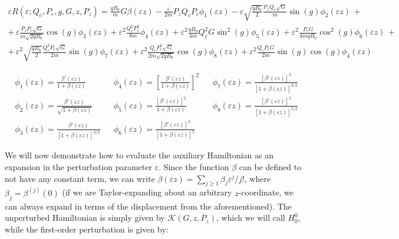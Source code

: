 \fi

\begin{gather*}
    \varepsilon R(\varepsilon;Q_c,P_c, g, G, z, P_z)=\frac{qB_0}{m}G\beta(\varepsilon z)-\frac{\varepsilon}{2m}P_zQ_cP_c \phi_1(\varepsilon z)-\varepsilon\sqrt{\frac{qB_0}{2}}\frac{P_zQ_c\sqrt{G}}{m}\sin{(g)} \phi_2(\varepsilon z)\,+\\
    +\,\varepsilon\frac{P_zP_c\sqrt{G}}{m\sqrt{2qB_0}}\cos{(g)} \phi_3(\varepsilon z)+\varepsilon^2\frac{Q_c^2P_c^2}{8m}\phi_4(\varepsilon z)+\varepsilon^2\frac{qB_0}{4m}Q_c^2G\sin^2{(g)}\phi_5(\varepsilon z)+\varepsilon^2\frac{P_cG}{4mqB_0}\cos^2{(g)}\phi_6(\varepsilon z)\,+\\
    +\,\varepsilon^2 \sqrt{\frac{qB_0}{2}}\frac{Q_c^2P_c\sqrt{G}}{2m}\sin{(g)}\phi_7(\varepsilon z)+\varepsilon^2\frac{Q_cP_c^2\sqrt{G}}{2m\sqrt{2qB_0}}\cos{(g)}\phi_8(\varepsilon z)+\varepsilon^2 \frac{Q_cP_c G}{2m}\sin{(g)}\cos{(g)}\phi_4(\varepsilon z)
\end{gather*}

\begin{align*}
    &\phi_1(\varepsilon z)=\frac{\beta'(\varepsilon z)}{1+\beta(\varepsilon z)} & &\phi_4(\varepsilon z)=\left[\frac{\beta'(\varepsilon z)}{1+\beta(\varepsilon z)}\right]^2 & &\phi_7(\varepsilon z)=\frac{\left[\beta'(\varepsilon z)\right]^2}{\left[1+\beta(\varepsilon z)\right]^{3/2}}\\
    &\phi_2(\varepsilon z)=\frac{\beta'(\varepsilon z)}{\sqrt{1+\beta(\varepsilon z)}}& &\phi_5(\varepsilon z)=\frac{\left[\beta'(\varepsilon z)\right]^2}{1+\beta(\varepsilon z)}& &\phi_8(\varepsilon z)=\frac{\left[\beta'(\varepsilon z)\right]^2}{\left[1+\beta(\varepsilon z)\right]^{5/2}}\\
    &\phi_3(\varepsilon z)=\frac{\beta'(\varepsilon z)}{\left[1+\beta(\varepsilon z)\right]^{3/2}} & &\phi_6(\varepsilon z)=\frac{\left[\beta'(\varepsilon z)\right]^2}{\left[1+\beta(\varepsilon z)\right]^3}
\end{align*}

We will now demonstrate how to evaluate the auxiliary Hamiltonian as an expansion in the perturbation parameter $\varepsilon$. Since the function $\beta$ can be defined to not have any constant term, we can write $\beta(\varepsilon z)=\sum_{j\geq1}\beta_j \varepsilon^j/j!$, where $\beta_j=\beta^{(j)}(0)$ (if we are Taylor-expanding about an arbitrary $z$-coordinate, we can always expand in terms of the displacement from the aforementioned). The unperturbed Hamiltonian is simply given by $\mathcal{K}(G,z,P_z)$, which we will call $H_0^0$, while the first-order perturbation is given by:

